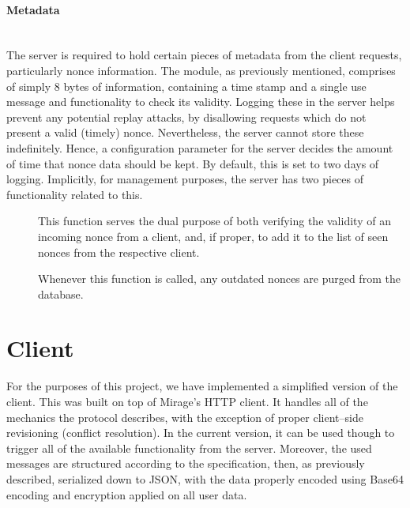 \paragraph{Metadata} ~\\
The server is required to hold certain pieces of metadata from the client requests, particularly nonce information.
The  module, as previously mentioned, comprises of simply 8 bytes of information, containing a time stamp and a single use message and functionality to check its validity.
Logging these in the server helps prevent any potential replay attacks, by disallowing requests which do not present a valid (timely) nonce.
Nevertheless, the server cannot store these indefinitely.
Hence, a configuration parameter for the server decides the amount of time that nonce data should be kept.
By default, this is set to two days of logging.
Implicitly, for management purposes, the server has two pieces of functionality related to this.
\begin{description}
\item[]
This function serves the dual purpose of both verifying the validity of an incoming nonce from a client, and, if proper, to add it to the list of seen nonces from the respective client.

\item[]
Whenever this function is called, any outdated nonces are purged from the database.
\end{description}

\section{Client}
For the purposes of this project, we have implemented a simplified version of the client.
This was built on top of Mirage's  HTTP client.
It handles all of the mechanics the protocol describes, with the exception of proper client--side revisioning (conflict resolution).
In the current version, it can be used though to trigger all of the available functionality from the server.
Moreover, the used messages are structured according to the specification, then, as previously described, serialized down to JSON, with the data properly encoded using Base64 encoding and encryption applied on all user data.

